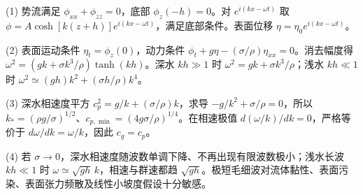 (1) 势流满足 \(\phi_{xx}+\phi_{zz}=0\)，底部 \(\phi_z(-h)=0\)。对 \(e^{i(kx-\omega t)}\) 取 \(\phi=A\cosh[k(z+h)]e^{i(kx-\omega t)}\)，满足底部条件。表面位移 \(\eta=\eta_0e^{i(kx-\omega t)}\)。

(2) 表面运动条件 \(\eta_t=\phi_z(0)\)，动力条件 \(\phi_t+g\eta-(\sigma/\rho)\eta_{xx}=0\)。消去幅度得 \(\boxed{\omega^2=(gk+\sigma k^3/\rho)\tanh(kh)}\)。深水 \(kh\gg1\) 时 \(\omega^2=gk+\sigma k^3/\rho\)；浅水 \(kh\ll1\) 时 \(\omega^2\simeq(gh)k^2+(\sigma h/\rho)k^4\)。

(3) 深水相速度平方 \(c_p^2=g/k+(\sigma/\rho)k\)，求导 \(-g/k^2+\sigma/\rho=0\)，所以 \(\boxed{k_*=(\rho g/\sigma)^{1/2}}\)、\(\boxed{c_{p,\min}=(4g\sigma/\rho)^{1/4}}\)。在相速极值 \(d(\omega/k)/dk=0\)，严格等价于 \(d\omega/dk=\omega/k\)，因此 \(c_g=c_p\)。

(4) 若 \(\sigma\to0\)，深水相速度随波数单调下降、不再出现有限波数极小；浅水长波 \(kh\ll1\) 时 \(\omega\simeq\sqrt{gh}\,k\)，相速与群速都趋 \(\sqrt{gh}\)。极短毛细波对流体黏性、表面污染、表面张力频散及线性小坡度假设十分敏感。

